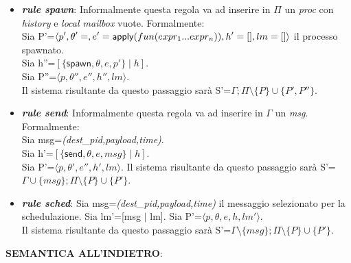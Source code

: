 \documentclass[background.tex]{subfiles}
\begin{document}
\begin{itemize}
	\item \textit{\textbf{rule spawn}}: Informalmente questa regola va ad inserire in $\Pi$ un \textit{proc} con \textit{history} e \textit{local mailbox} vuote. Formalmente:\\
	Sia P'=$\displaystyle \langle p',\theta'=\empty,e'=\mathsf{apply}(fun(expr_{1}...expr_{n})),h'=[],lm=[]\rangle$ il processo spawnato.\\
	Sia h''=$\displaystyle [\{\mathsf{spawn},\theta,e,p'\} \mid h]$.\\
	Sia P''=$\displaystyle \langle p,\theta'',e'',h'',lm\rangle$.\\
	Il sistema risultante da questo passaggio sarà S'=$\displaystyle \Gamma;\Pi\setminus\{P\}\cup\{P',P''\}$.
	\item \textit{\textbf{rule send}}: Informalmente questa regola va ad inserire in $\Gamma$ un \textit{msg}. Formalmente:\\
	Sia msg=\textit{(dest\_pid,payload,time)}.\\
	Sia h'=$\displaystyle [\{\mathsf{send},\theta,e,msg\} \mid h]$.\\
	Sia P'=$\displaystyle \langle p,\theta',e'',h',lm \rangle$.
	Il sistema risultante da questo passaggio sarà S'=$\displaystyle \Gamma\cup\{msg\};\Pi\setminus\{P\}\cup\{P'\}$.
	\item \textit{\textbf{rule sched}}: 
	Sia msg=\textit{(dest\_pid,payload,time)} il messaggio selezionato per la schedulazione.
	Sia lm'=[msg $\mid$ lm].
	Sia P'=$\displaystyle \langle p,\theta,e,h,lm'\rangle$.\\
	Il sistema risultante da questo passaggio sarà S'=$\displaystyle \Gamma\setminus\{msg\};\Pi\setminus\{P\}\cup\{P'\}$.
\end{itemize}
\textbf{SEMANTICA ALL'INDIETRO}:
\end{document}
